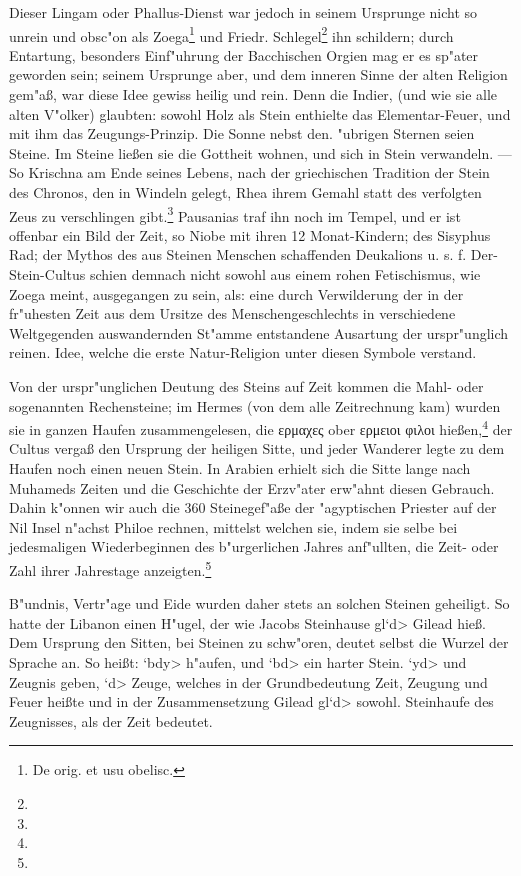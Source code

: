 \documentclass[a4paper, 11pt, oneside, polutonikogreek, german]{article}
\begin{document}
Dieser Lingam oder Phallus-Dienst war jedoch in seinem Ursprunge nicht so unrein und obsc"on als Zoega\footnote{De orig. et usu obelisc.} und Friedr. Schlegel\footnote{} ihn schildern; durch Entartung, besonders Einf"uhrung der Bacchischen Orgien mag er es sp"ater geworden sein; seinem Ursprunge aber, und dem inneren Sinne der alten Religion gem"aß, war diese Idee gewiss heilig und rein. Denn die Indier, (und wie sie alle alten V"olker) glaubten: sowohl Holz als Stein enthielte das Elementar-Feuer, und mit ihm das Zeugungs-Prinzip. Die Sonne nebst den. "ubrigen Sternen seien Steine. Im Steine ließen sie die Gottheit wohnen, und sich in Stein verwandeln. --- So Krischna am Ende seines Lebens, nach der griechischen Tradition der Stein des Chronos, den in Windeln gelegt, Rhea ihrem Gemahl statt des verfolgten Zeus zu verschlingen gibt.\footnote{} Pausanias traf ihn noch im Tempel, und er ist offenbar ein Bild der Zeit, so Niobe mit ihren 12 Monat-Kindern; des Sisyphus Rad; der Mythos des aus Steinen Menschen schaffenden Deukalions u. s. f. Der-Stein-Cultus schien demnach nicht sowohl aus einem rohen Fetischismus, wie Zoega meint, ausgegangen zu sein, als: eine durch Verwilderung der in der fr"uhesten Zeit aus dem Ursitze des Menschengeschlechts in verschiedene Weltgegenden auswandernden St"amme entstandene Ausartung der urspr"unglich reinen. Idee, welche die erste Natur-Religion unter diesen Symbole verstand.

Von der urspr"unglichen Deutung des Steins auf Zeit kommen die Mahl- oder sogenannten Rechensteine; im Hermes (von dem alle Zeitrechnung kam) wurden sie in ganzen Haufen zusammengelesen, die ερμαχες ober ερμειοι φιλοι hießen,\footnote{} der Cultus vergaß den Ursprung der heiligen Sitte, und jeder Wanderer legte zu dem Haufen noch einen neuen Stein. In Arabien erhielt sich die Sitte lange nach Muhameds Zeiten und die Geschichte der Erzv"ater erw"ahnt diesen Gebrauch. Dahin k"onnen wir auch die 360 Steinegef"aße der "agyptischen Priester auf der Nil Insel n"achst Philoe rechnen, mittelst welchen sie, indem sie selbe bei jedesmaligen Wiederbeginnen des b"urgerlichen Jahres anf"ullten, die Zeit- oder Zahl ihrer Jahrestage anzeigten.\footnote{}

B"undnis, Vertr"age und Eide wurden daher stets an solchen Steinen geheiligt. So hatte der Libanon einen H"ugel, der wie Jacobs Steinhause \<gl`d> Gilead hieß. Dem Ursprung den Sitten, bei Steinen zu schw"oren, deutet selbst die Wurzel der Sprache an. So heißt: \<`bdy> h"aufen, und \<`bd> ein harter Stein. \<`yd> und Zeugnis geben, \<`d> Zeuge, welches in der Grundbedeutung Zeit, Zeugung und Feuer heißte und in der Zusammensetzung Gilead \<gl`d> sowohl. Steinhaufe des Zeugnisses, als der Zeit bedeutet.
\end{document}
